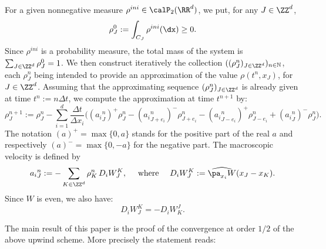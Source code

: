 For a given nonnegative measure $\rho^{ini}\in
\calP_2(\RR^d)$, we put, for any $J\in \ZZ^d$,
\begin{equation}\label{disrho0}
\rho_{J}^0:= \int_{C_J} \rho^{ini}(\dx)\geq 0.
\end{equation}
Since $\rho^{ini}$ is a probability measure, the total mass of the system is $\sum_{J\in \ZZ^d} \rho_{J}^0 = 1$. We then construct iteratively the collection $((\rho_J^n)_{J \in \ZZ^d})_{n \in {\mathbb N}}$, each $\rho^n_{J}$ being intended to provide an approximation of the value $\rho(t^n,x_J)$, for $J\in \ZZ^d$. Assuming that the approximating sequence $(\rho_{J}^n)_{J\in \ZZ^d}$ is already given at time $t^n:=n \Delta t$, we compute the approximation at time $t^{n+1}$ by:
\begin{equation}\label{dis_num}
 \rho_{J}^{n+1} :=  \rho_{J}^n - \sum_{i=1}^{d} \frac{\Delta t}{\Delta x_i}
\Big(({a_i}^n_{J})^+ \rho_{J}^n - ({a_i}^n_{J+e_i})^- \rho_{J+e_i}^n -({a_i}^n_{J-e_i})^+ \rho_{J-e_i}^n + ({a_i}^n_{J})^- \rho_{J}^n \Big).
\end{equation}
The notation $(a)^+ = \max\{0,a\}$ stands for the positive part of the real $a$ and respectively $(a)^- = \max\{0,-a\}$ for the negative part. The macroscopic velocity is defined by
\begin{equation}\label{def:aij}
{a_i}^n_{J} := -\sum_{K\in \ZZ^d} \rho_{K}^n \,D_iW_J^K,
\quad \text{ where } \quad D_iW_J^K := \widehat{\pa_{x_i} W}(x_J-x_K).
\end{equation}
Since $W$ is even, we also have:
\begin{equation}\label{eq:gradients:symmetry:cells}
D_iW_{J}^{K} = -D_iW^{J}_{K}.
\end{equation}

The main result of this paper is the proof of the convergence at order $1/2$ of the above upwind scheme. More precisely the statement reads:

